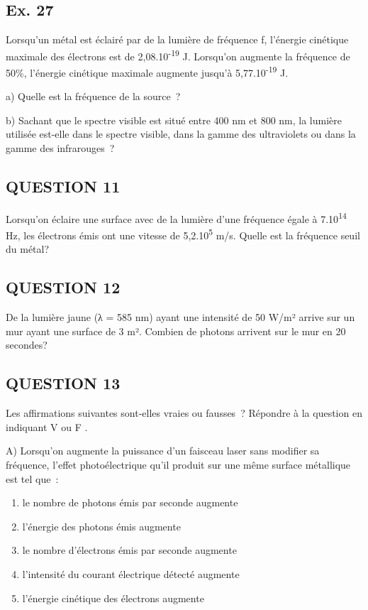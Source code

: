 {\subsection{Ex. 27}

Lorsqu'un métal est éclairé par de la lumière de fréquence f, l'énergie
cinétique maximale des électrons est de 2,08.10\textsuperscript{-19} J.
Lorsqu'on augmente la fréquence de 50\%, l'énergie cinétique maximale
augmente jusqu'à 5,77.10\textsuperscript{-19} J.

a) Quelle est la fréquence de la source~?

b) Sachant que le spectre visible est situé entre 400 nm et 800 nm, la
lumière utilisée est-elle dans le spectre visible, dans la gamme des
ultraviolets ou dans la gamme des infrarouges~?

\subsection{QUESTION 11}

Lorsqu'on éclaire une surface avec de la lumière d'une fréquence égale à
7.10\textsuperscript{14 }Hz, les électrons émis ont une vitesse de
5,2.10\textsuperscript{5} m/s. Quelle est la fréquence seuil du métal?

\subsection{QUESTION 12}

De la lumière jaune (λ = 585 nm) ayant une intensité de 50 W/m² arrive
sur un mur ayant une surface de 3 m². Combien de photons arrivent sur le
mur en 20 secondes?

\subsection{QUESTION 13}

Les affirmations suivantes sont-elles vraies ou fausses~? Répondre à la
question en indiquant V ou F .

A) Lorsqu'on augmente la puissance d'un faisceau laser sans modifier sa
fréquence, l'effet photoélectrique qu'il produit sur une même surface
métallique est tel que~:
\begin{enumerate}
\item  le nombre de photons émis par seconde augmente
\item  l'énergie des photons émis augmente
\item  le nombre d'électrons émis par seconde augmente
\item  l'intensité du courant électrique détecté augmente
\item  l'énergie cinétique des électrons augmente
\end{enumerate}

}
